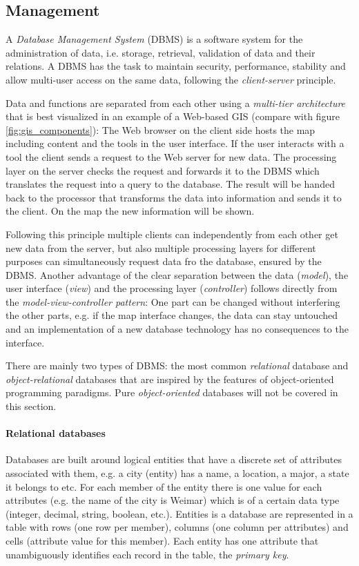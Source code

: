 

\subsection{Management} %
\label{sub:management}

A \emph{Database Management System} (DBMS) is a software system for the administration of data, i.e. storage, retrieval, validation of data and their relations. A DBMS has the task to maintain security, performance, stability and allow multi-user access on the same data, following the \emph{client-server} principle.

Data and functions are separated from each other using a \emph{multi-tier architecture} that is best visualized in an example of a Web-based GIS (compare with figure \ref{fig:gis_components}): The Web browser on the client side hosts the map including content and the tools in the user interface. If the user interacts with a tool the client sends a request to the Web server for new data. The processing layer on the server checks the request and forwards it to the DBMS which translates the request into a query to the database. The result will be handed back to the processor that transforms the data into information and sends it to the client. On the map the new information will be shown.

Following this principle multiple clients can independently from each other get new data from the server, but also multiple processing layers for different purposes can simultaneously request data fro the database, ensured by the DBMS. Another advantage of the clear separation between the data (\emph{model}), the user interface (\emph{view}) and the processing layer (\emph{controller}) follows directly from the \emph{model-view-controller pattern}: One part can be changed without interfering the other parts, e.g. if the map interface changes, the data can stay untouched and an implementation of a new database technology has no consequences to the interface.

There are mainly two types of DBMS: the most common \emph{relational} database and \emph{object-relational} databases that are inspired by the features of object-oriented programming paradigms. Pure \emph{object-oriented} databases will not be covered in this section.

\paragraph{Relational databases} %
\label{par:relational_databases}
Databases are built around logical entities that have a discrete set of attributes associated with them, e.g. a city (entity) has a name, a location, a major, a state it belongs to etc. For each member of the entity there is one value for each attributes (e.g. the name of the city is Weimar) which is of a certain data type (integer, decimal, string, boolean, etc.). Entities is a database are represented in a table with rows (one row per member), columns (one column per attributes) and cells (attribute value for this member). Each entity has one attribute that unambiguously identifies each record in the table, the \emph{primary key}.

